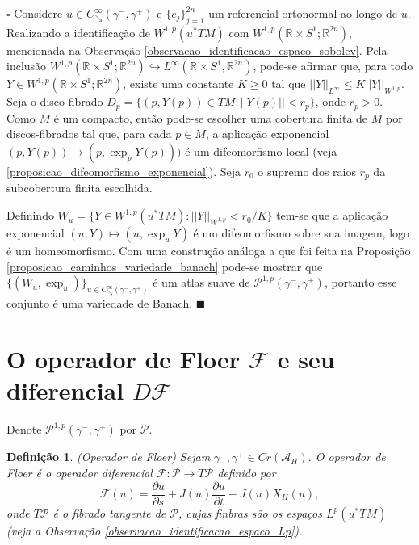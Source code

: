 \documentclass[12pt]{book}
\newtheorem{definicao}[teorema]{Definição}
\newenvironment{prova}[1]{$\square$ #1}{\hfill$\blacksquare$}
\newcommand{\caminhosdecaimentoexponencial}[2]{C^{\infty}_{\searrow}(#1, #2)}
\newcommand{\caminhosdecaimentoexponencialpadrao}{\caminhosdecaimentoexponencial{\gamma^{-}}{\gamma^{+}}}
\newcommand{\caminhosexponenciaisconectantesabrev}{\mathcal{P}}
\newcommand{\caminhosexponenciaisconectantes}[2]{\mathcal{P}^{1,p}(#1, #2)}
\newcommand{\caminhosexponenciaisconectantespadrao}{\caminhosexponenciaisconectantes{\gamma^{-}}{\gamma^{+}}}
\newcommand{\circulo}{S^{1}}
\newcommand{\diferencialfloer}{D\operadorFloer}
\newcommand{\derivadaparcial}[2]{\frac{\partial #1}{\partial #2}}
\newcommand{\espacoLp}[1]{L^{p}(#1)}
\newcommand{\espacosobolev}[1]{W^{1,p}(#1)}
\newcommand{\espacosobolevcontradominio}[2]{W^{1,p}(#1;#2)}
\newcommand{\funcionalH}{\mathcal{A}_{H}}
\newcommand{\operadorFloer}{\mathcal{F}}
\newcommand{\operadorFloerDefinicao}[1]{\derivadaparcial{#1}{s} + J(#1)\derivadaparcial{#1}{t} - J(#1)X_{H}(#1)}
\newcommand{\operadorFloerParametro}[1]{\mathcal{F}(#1)}
\newcommand{\norma}[1]{||#1||}
\newcommand{\normaWp}[1]{||#1||_{W^{1,p}}}
\newcommand{\pontoscriticos}[1]{\textit{Cr}(#1)}
\newcommand{\pullbackfibradotangente}[2]{#1^{*}T#2}
\newcommand{\pullbackfibradotangenteM}[1]{\pullbackfibradotangente{#1}{M}}
\newcommand{\retacartesianocirculo}{\real{} \times \circulo}
\newcommand{\real}[1]{\mathbb{R}^{#1}}
\begin{document}
	\begin{prova}
		Considere $u \in \caminhosdecaimentoexponencialpadrao$ e $\{e_{j}\}_{j=1}^{2n}$ um referencial ortonormal ao longo de $u$.  Realizando a identificação de  $\espacosobolev{\pullbackfibradotangenteM{u}}$ com $\espacosobolevcontradominio{\retacartesianocirculo}{\real{2n}}$, mencionada na Observação \ref{observacao_identificacao_espaco_sobolev}. Pela inclusão $\espacosobolevcontradominio{\retacartesianocirculo}{\real{2n}} \hookrightarrow L^{\infty}(\retacartesianocirculo, \real{2n})$, pode-se afirmar que, para todo $Y \in \espacosobolevcontradominio{\retacartesianocirculo}{\real{2n}}$, existe uma constante $K\geq 0$ tal que $\norma{Y}_{L^{\infty}} \leq K\normaWp{Y}$. Seja o disco-fibrado $D_{p}=\{(p, Y(p))\in TM: \norma{Y(p)}<r_{p} \}$, onde $r_{p}>0$. Como $M $ é um compacto, então pode-se escolher uma cobertura finita de $M$ por discos-fibrados tal que, para cada $p \in M$, a aplicação exponencial $(p,Y(p))\mapsto (p, \exp_{p}Y(p)))$ é um difeomorfismo local (veja \ref{proposicao_difeomorfismo_exponencial}). Seja $r_{0}$ o supremo dos raios $r_{p}$ da subcobertura finita escolhida. 
		
		Definindo $W_{u} = \{Y\in \espacosobolev{\pullbackfibradotangenteM{u}}:\normaWp{Y} < r_{0}/K\}$ tem-se que a aplicação exponencial $(u, Y) \mapsto (u, \exp_{u}Y)$ é um difeomorfismo sobre sua imagem, logo é um homeomorfismo. Com uma construção análoga a que foi feita na Proposição \ref{proposicao_caminhos_variedade_banach} pode-se mostrar que $\{(W_{u}, \exp_{u})\}_{u \in \caminhosdecaimentoexponencialpadrao}$ é um atlas suave de $\caminhosexponenciaisconectantespadrao$, portanto esse conjunto é uma variedade de Banach. 
	\end{prova}
	
	\section{O operador de Floer $\operadorFloer$ e seu diferencial $\diferencialfloer$}\label{secao_operador_floer}
	
	Denote $\caminhosexponenciaisconectantespadrao$ por $\caminhosexponenciaisconectantesabrev$.
	
	\begin{definicao}\label{definicao_operador_floer}
		(Operador de Floer) Sejam $\gamma^{-}, \gamma^{+}\in \pontoscriticos{\funcionalH}$. O operador de Floer é o operador diferencial $\operadorFloer: \caminhosexponenciaisconectantesabrev \to T\caminhosexponenciaisconectantesabrev$ definido por
		$$
		\operadorFloerParametro{u} =\operadorFloerDefinicao{u},
		$$
		onde $T\caminhosexponenciaisconectantesabrev$ é o fibrado tangente de $\caminhosexponenciaisconectantesabrev$, cujas finbras são os espaços $\espacoLp{\pullbackfibradotangenteM{u}	}$ (veja a Observação \ref{observacao_identificacao_espaco_Lp}).
	\end{definicao}
	
\end{document}

